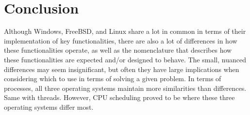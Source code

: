\documentclass[letterpaper,10pt,draftclsnofoot,onecolumn]{IEEEtran}
\begin{document}
\section{Conclusion}
Although Windows, FreeBSD, and Linux share a lot in common in terms of their implementation of key functionalities, there are also a lot of differences in how these functionalities operate, as well as the nomenclature that describes how these functionalities are expected and/or designed to behave. The small, nuanced differences may seem insignificant, but often they have large implications when considering which to use in terms of solving a given problem. In terms of processes, all three operating systems maintain more similarities than differences. Same with threads. However, CPU scheduling proved to be where these three operating systems differ most.

\newpage


\end{document}
